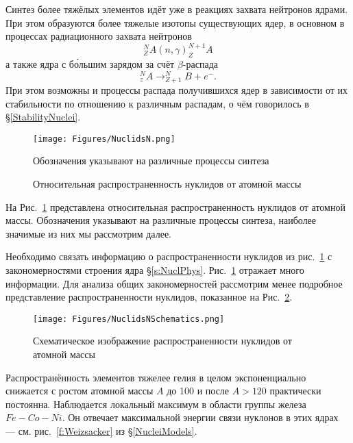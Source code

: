 \documentclass[a5paper,openany]{book}
\begin{document}
	Синтез более тяжёлых элементов идёт уже в реакциях захвата нейтронов ядрами. При этом образуются более тяжелые изотопы существующих ядер, в основном в процессах радиационного захвата нейтронов 
	\begin{equation}\label{neutroncapture}
	^N_ZA(n, \gamma)^{N+1}_ZA
	\end{equation}
	а также ядра с б\'{о}льшим зарядом за счёт $\beta$-распада  
	\begin{equation}\label{betadecay}
	^N_zA \longrightarrow ^N_{Z+1}B+e^{-}.
	\end{equation}
	При этом возможны и процессы распада получившихся ядер в зависимости от их стабильности по отношению к различным распадам, о чём говорилось в \S\ref{StabilityNuclei}.
	
	\begin{figure}[ht] 
		\centering\small
		\unitlength=1mm
		\texttt{[image: Figures/NuclidsN.png]} 
		\caption{Относительная распространенность нуклидов от атомной массы \cite{ElementsOrigin}}
			Обозначения указывают на различные процессы синтеза 
		\label{f:NuclidsN}
	\end{figure}

	На Рис.~\ref{f:NuclidsN} представлена относительная распространенность нуклидов от атомной массы.
Обозначения указывают на различные процессы синтеза, наиболее значимые из них мы рассмотрим далее.

	
	Необходимо связать информацию о распространенности нуклидов из рис.~\ref{f:NuclidsN} с закономерностями строения ядра \S\ref{s:NuclPhys}. Рис.~\ref{f:NuclidsN} отражает много информации. Для анализа общих закономерностей рассмотрим менее подробное представление распространенности нуклидов, показанное на Рис.~\ref{f:NuclidsNSchematics}.
	\begin{figure}[ht] 
		\centering\small
		\unitlength=1mm
		\texttt{[image: Figures/NuclidsNSchematics.png]} 
		\caption{Схематическое изображение распространенности нуклидов от атомной массы \cite{ElementsOrigin}}
		\label{f:NuclidsNSchematics}
	\end{figure}
	
	 Распространённость элементов тяжелее гелия в целом экспоненциально снижается с ростом атомной массы $A$ до 100 и после $A >120$ практически постоянна. Наблюдается локальный максимум в области группы железа $Fe-Co-Ni$. 
	Он отвечает максимальной энергии связи нуклонов в этих ядрах --- см. рис.~\ref{f:Weizsacker} из \S\ref{NucleiModels}. 
	
\end{document}
